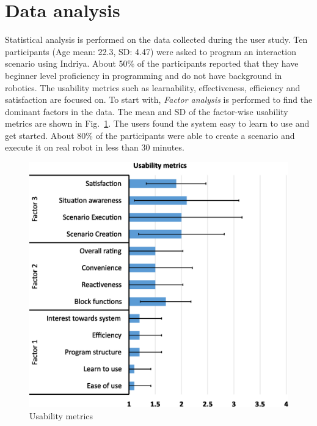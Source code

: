\section{Data analysis}
Statistical analysis is performed on the data collected during the user study. Ten participants (Age mean: 22.3, SD: 4.47) were asked to program an interaction scenario using Indriya. About 50\% of the participants reported that they have beginner level proficiency in programming and do not have background in robotics. The usability metrics such as learnability, effectiveness, efficiency and satisfaction are focused on. To start with, \emph{Factor analysis} is performed to find the dominant factors in the data. The mean and SD of the factor-wise usability metrics are shown in Fig.~\ref{fig:metrics}. The users found the system easy to learn to use and get started. About 80\% of the participants were able to create a scenario and execute it on real robot in less than 30 minutes.
 \begin{figure}
 \centering
 \includegraphics[width=\columnwidth]{../../thesis/assets/usability.eps}
 \caption[Usability metrics]{Usability metrics}
 \label{fig:metrics}
 \end{figure}

